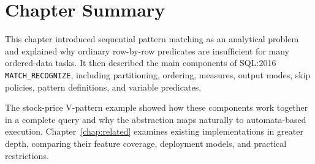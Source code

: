 \section{Chapter Summary}
\label{sec:bg-summary}

This chapter introduced sequential pattern matching as an analytical
problem and explained why ordinary row-by-row predicates are
insufficient for many ordered-data tasks.  It then described the
main components of SQL:2016 \texttt{MATCH\_RECOGNIZE}, including
partitioning, ordering, measures, output modes, skip policies,
pattern definitions, and variable predicates.

The stock-price V-pattern example showed how these components work
together in a complete query and why the abstraction maps naturally
to automata-based execution.  Chapter~\ref{chap:related} examines
existing implementations in greater depth, comparing their feature
coverage, deployment models, and practical restrictions.
